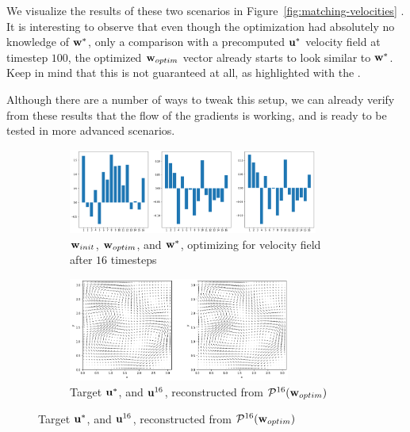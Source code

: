 We visualize the results of these two scenarios in
Figure~\ref{fig:matching-velocities} . It is interesting to observe that even
though the optimization had absolutely no knowledge of $\vb{w}^*$, only
a comparison with a precomputed $\vb{u^*}$ velocity field at timestep $100$, the
optimized $\vb{w}_{optim}$ vector already starts to look similar to $\vb{w}^*$.
Keep in mind that this is not guaranteed at all, as highlighted with the
. 

Although there are a number of ways to tweak this setup, we can already verify
from these results that  the flow of the gradients is working, and is ready to
be tested in more advanced scenarios.

\begin{figure}
  \centering
  \begin{subfigure}{\textwidth}
    \centering
    \includegraphics[width=0.9\textwidth]{figures/finding-initial-velocities/t_16_coefficients.png}
    \caption{$\vb{w}_{init}$, $\vb{w}_{optim}$, and
    $\vb{w}^*$, optimizing for velocity field after $16$ timesteps}
    \label{fig:16-timesteps-coeffs}
  \end{subfigure}\par\medskip
  \begin{subfigure}{\textwidth}
    \centering
    \includegraphics[width=0.8\textwidth]{figures/finding-initial-velocities/t_16_velocities.png}
    \caption{Target $\vb{u}^*$, and $\vb{u}^{16}$, reconstructed from
      $\mathcal{P}^{16}(\vb{w}_{optim})$\\}
    \label{fig:16-timesteps-vel}
  \end{subfigure}\par\medskip

\end{figure}
